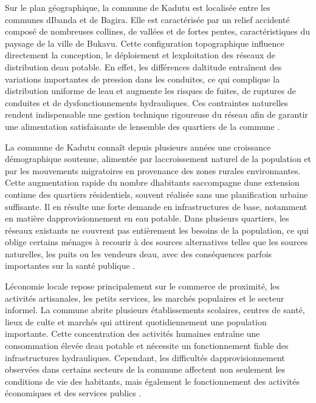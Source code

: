 \documentclass[12pt,a4paper,oneside]{report}
\begin{document}
Sur le plan géographique, la commune de Kadutu est localisée entre les
communes d\textquotesingle Ibanda et de Bagira. Elle est caractérisée
par un relief accidenté composé de nombreuses collines, de vallées et de
fortes pentes, caractéristiques du paysage de la ville de Bukavu. Cette
configuration topographique influence directement la conception, le
déploiement et l\textquotesingle exploitation des réseaux de
distribution d\textquotesingle eau potable. En effet, les différences
d\textquotesingle altitude entraînent des variations importantes de
pression dans les conduites, ce qui complique la distribution uniforme
de l\textquotesingle eau et augmente les risques de fuites, de ruptures
de conduites et de dysfonctionnements hydrauliques. Ces contraintes
naturelles rendent indispensable une gestion technique rigoureuse du
réseau afin de garantir une alimentation satisfaisante de
l\textquotesingle ensemble des quartiers de la commune \cite{ref82}.

La commune de Kadutu connaît depuis plusieurs années une croissance
démographique soutenue, alimentée par l\textquotesingle accroissement
naturel de la population et par les mouvements migratoires en provenance
des zones rurales environnantes. Cette augmentation rapide du nombre
d\textquotesingle habitants s\textquotesingle accompagne
d\textquotesingle une extension continue des quartiers résidentiels,
souvent réalisée sans une planification urbaine suffisante. Il en
résulte une forte demande en infrastructures de base, notamment en
matière d\textquotesingle approvisionnement en eau potable. Dans
plusieurs quartiers, les réseaux existants ne couvrent pas entièrement
les besoins de la population, ce qui oblige certains ménages à recourir
à des sources alternatives telles que les sources naturelles, les puits
ou les vendeurs d\textquotesingle eau, avec des conséquences parfois
importantes sur la santé publique \cite{ref85}.

L\textquotesingle économie locale repose principalement sur le commerce
de proximité, les activités artisanales, les petits services, les
marchés populaires et le secteur informel. La commune abrite plusieurs
établissements scolaires, centres de santé, lieux de culte et marchés
qui attirent quotidiennement une population importante. Cette
concentration des activités humaines entraîne une consommation élevée
d\textquotesingle eau potable et nécessite un fonctionnement fiable des
infrastructures hydrauliques. Cependant, les difficultés
d\textquotesingle approvisionnement observées dans certains secteurs de
la commune affectent non seulement les conditions de vie des habitants,
mais également le fonctionnement des activités économiques et des
services publics \cite{ref87}.
\end{document}
